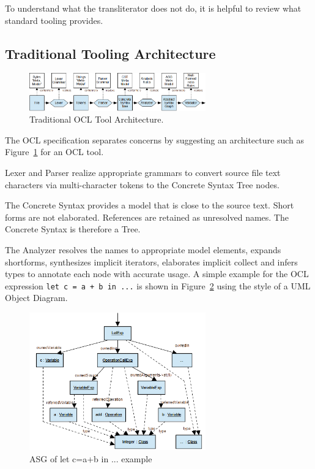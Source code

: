 \documentclass[sigconf]{acmart}
\begin{document}
To understand what the transliterator does not do, it is helpful to review what standard tooling provides.

\subsection{Traditional Tooling Architecture}

\begin{figure}
	\includegraphics[width=3.0in]{OCLAnalysis.png}
	\caption{Traditional OCL Tool Architecture.}
	\label{fig:parsing}
\end{figure}

The OCL specification separates concerns by suggesting an architecture such as Figure~\ref{fig:parsing} for an OCL tool.

Lexer and Parser realize appropriate grammars to convert source file text characters via multi-character tokens to the Concrete Syntax Tree nodes.  

The Concrete Syntax provides a model that is close to the source text. Short forms are not elaborated. References are retained as unresolved names. The Concrete Syntax is therefore a Tree.

The Analyzer resolves the names to appropriate model elements, expands shortforms, synthesizes implicit iterators, elaborates implicit collect and infers types to annotate each node with accurate usage. A simple example for the OCL expression \verb|let c = a + b in ...| is shown in Figure~\ref{fig:exampleASG} using the style of a UML Object Diagram.

\begin{figure}
	\includegraphics[width=3.0in]{OCLExampleASG.png}
	\caption{ASG of let c=a+b in ... example}
	\label{fig:exampleASG}
\end{figure}
\end{document}
